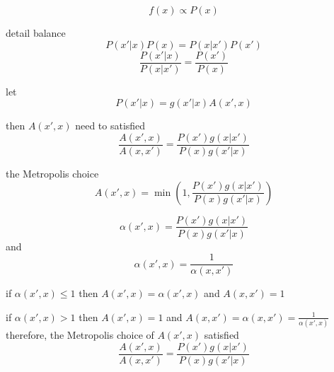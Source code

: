 \documentclass[12pt,a4paper]{article}
\author{Jiejia Xu}
\begin{document}
\[
f(x) \propto P(x)
\]

detail balance
\[
P(x'|x)P(x) = P(x|x')P(x')
\]
\[
\frac{P(x'|x)}{P(x|x')}=\frac{P(x')}{P(x)}
\]

let
\[
P(x'|x) = g(x'|x)A(x',x)
\]

then $A(x',x)$ need to satisfied
\[
\frac{A(x',x)}{A(x,x')}=\frac{P(x')g(x|x')}{P(x)g(x'|x)}
\]

the Metropolis choice
\[
A(x',x) = \min \left ( 1,\frac{P(x')g(x|x')}{P(x)g(x'|x)} \right)
\]

\[
\alpha(x',x) = \frac{P(x')g(x|x')}{P(x)g(x'|x)} 
\]
and
\[
\alpha(x',x) = \frac{1}{\alpha(x,x')}
\]


if $\alpha(x',x) \leq 1$ then $A(x',x) = \alpha(x',x)$ and $A(x,x') =1$

if $\alpha(x',x) > 1$ then $A(x',x) = 1$ and $A(x,x') =\alpha(x,x') = \frac{1}{\alpha(x',x)}$
therefore, the Metropolis choice of $A(x',x)$ satisfied
\[
\frac{A(x',x)}{A(x,x')}=\frac{P(x')g(x|x')}{P(x)g(x'|x)}
\]
\end{document}
